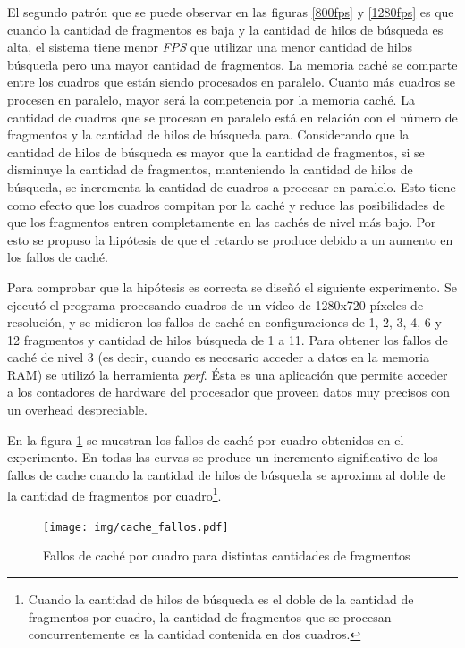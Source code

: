 El segundo patrón que se puede observar en las figuras \ref{800fps} y
\ref{1280fps} es que cuando la cantidad de fragmentos es baja y la cantidad de
hilos de búsqueda es alta, el sistema tiene menor \emph{FPS} que utilizar una
menor cantidad de hilos búsqueda pero una mayor cantidad de fragmentos. La
memoria caché se comparte entre los cuadros que están siendo procesados en
paralelo. Cuanto más cuadros se procesen en paralelo, mayor será la competencia
por la memoria caché. La cantidad de cuadros que se procesan en paralelo está en
relación con el número de fragmentos y la cantidad de hilos de búsqueda para.
Considerando que la cantidad de hilos de búsqueda es mayor
que la cantidad de fragmentos, si se disminuye la cantidad de fragmentos,
manteniendo la cantidad de hilos de búsqueda, se
incrementa la cantidad de cuadros a procesar en paralelo. Esto tiene como efecto
que los cuadros compitan por la caché y reduce las posibilidades de que los
fragmentos entren completamente en las cachés de nivel más bajo. Por esto se
propuso la hipótesis de que el retardo se produce debido a un aumento en los
fallos de caché.

Para comprobar que la hipótesis es correcta se diseñó el siguiente experimento.
Se ejecutó el programa procesando cuadros de un vídeo de 1280x720 píxeles de
resolución, y se midieron los fallos de caché en configuraciones de 1, 2, 3, 4,
6 y 12 fragmentos y cantidad de hilos búsqueda de 1 a 11. Para obtener los
fallos de caché de nivel 3 (es decir, cuando es necesario acceder a datos en la
memoria RAM) se utilizó la herramienta \emph{perf}. Ésta es una aplicación que
permite acceder a los contadores de hardware del procesador que proveen datos
muy precisos con un overhead despreciable.

En la figura \ref{cacheFallos} se muestran los fallos de caché por cuadro
obtenidos en el experimento. En todas las curvas se produce un incremento
significativo de los fallos de cache cuando la cantidad de hilos de búsqueda se
aproxima al doble de la cantidad de fragmentos por cuadro\footnote{Cuando la
cantidad de hilos de búsqueda es el doble de la cantidad de fragmentos por
cuadro, la cantidad de fragmentos que se procesan concurrentemente es la
cantidad contenida en dos cuadros.}.

\begin{figure}[!h]

	\texttt{[image: img/cache\_fallos.pdf]}
	\caption{Fallos de caché por cuadro para distintas cantidades de
	fragmentos}
	\label{cacheFallos}

\end{figure}

